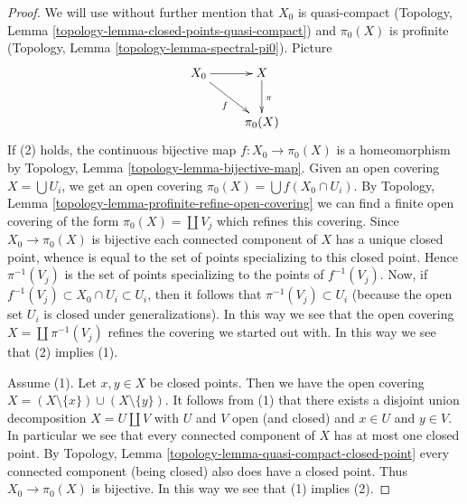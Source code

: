 \documentclass{stacks-project}
\theoremstyle{plain}
\theoremstyle{definition}
\theoremstyle{remark}
\numberwithin{equation}{subsection}
\begin{document}
\begin{proof}
We will use without further mention that
$X_0$ is quasi-compact
(Topology, Lemma \ref{topology-lemma-closed-points-quasi-compact})
and $\pi_0(X)$ is profinite
(Topology, Lemma \ref{topology-lemma-spectral-pi0}).
Picture
$$
\xymatrix{
X_0 \ar[rd]_f \ar[r] & X \ar[d]^\pi \\
& \pi_0(X)
}
$$
If (2) holds, the continuous bijective map $f : X_0 \to \pi_0(X)$ is
a homeomorphism by
Topology, Lemma \ref{topology-lemma-bijective-map}.
Given an open covering $X = \bigcup U_i$, we get an open covering
$\pi_0(X) = \bigcup f(X_0 \cap U_i)$. By
Topology, Lemma \ref{topology-lemma-profinite-refine-open-covering}
we can find a finite open covering of the form $\pi_0(X) = \coprod V_j$
which refines this covering.
Since $X_0 \to \pi_0(X)$ is bijective each connected component of
$X$ has a unique closed point, whence is equal to the set of points
specializing to this closed point. Hence $\pi^{-1}(V_j)$ is the
set of points specializing to the points of $f^{-1}(V_j)$.
Now, if $f^{-1}(V_j) \subset X_0 \cap U_i \subset U_i$, then
it follows that $\pi^{-1}(V_j) \subset U_i$ (because the open set
$U_i$ is closed under generalizations). In this way we see
that the open covering $X = \coprod \pi^{-1}(V_j)$ refines
the covering we started out with. In this way we see that
(2) implies (1).

\medskip\noindent
Assume (1). Let $x, y \in X$ be closed points. Then we have the open covering
$X = (X \setminus \{x\}) \cup (X \setminus \{y\})$.
It follows from (1) that there exists a disjoint union decomposition
$X = U \amalg V$ with $U$ and $V$ open (and closed) and $x \in U$ and
$y \in V$. In particular we see that every connected component of $X$
has at most one closed point. By
Topology, Lemma \ref{topology-lemma-quasi-compact-closed-point}
every connected component (being closed) also does have a closed point.
Thus $X_0 \to \pi_0(X)$ is bijective. In this way we see that (1) implies (2).


\end{proof}
\end{document}
